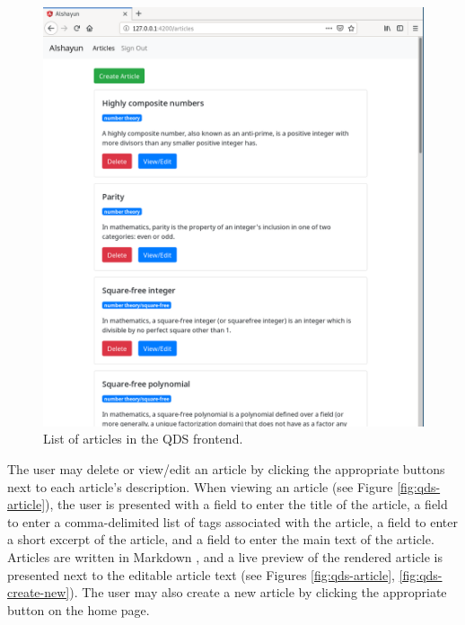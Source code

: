\documentclass[12pt]{report}
\begin{document}
\begin{figure}
    \centering
    \includegraphics[scale=0.4]{images/qds-articles.png}
    \caption{List of articles in the QDS frontend.}
    \label{fig:qds-articles}
\end{figure}

The user may delete or view/edit an article by clicking the appropriate buttons
next to each article's description. When viewing an article (see Figure
\ref{fig:qds-article}), the user is presented with a field to enter the title of
the article, a field to enter a comma-delimited list of tags associated with the
article, a field to enter a short excerpt of the article, and a field to enter
the main text of the article. Articles are written in Markdown \cite{markdown},
and a live preview of the rendered article is presented next to the editable
article text (see Figures \ref{fig:qds-article}, \ref{fig:qds-create-new}).  The
user may also create a new article by clicking the appropriate button on the
home page.
\end{document}
